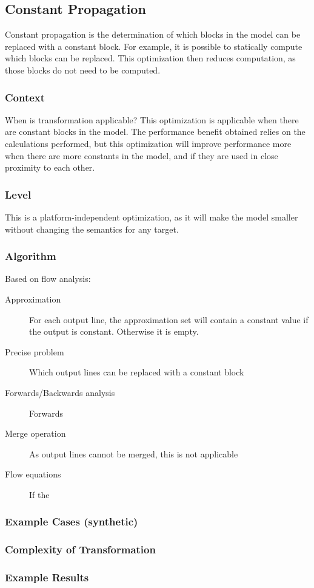 \subsection{Constant Propagation}

Constant propagation is the determination of which blocks in the model can be replaced with a constant block. For example, it is possible to statically compute which blocks can be replaced. This optimization then reduces computation, as those blocks do not need to be computed.

\subsubsection{Context}
When is transformation applicable?
This optimization is applicable when there are constant blocks in the model. The performance benefit obtained relies on the calculations performed, but this optimization will improve performance more when there are more constants in the model, and if they are used in close proximity to each other.


\subsubsection{Level}
This is a platform-independent optimization, as it will make the model smaller without changing the semantics for any target.

\subsubsection{Algorithm}
Based on flow analysis:
\begin{description}
\item[Approximation] For each output line, the approximation set will contain a constant value if the output is constant. Otherwise it is empty.

\item[Precise problem] Which output lines can be replaced with a constant block

\item[Forwards/Backwards analysis] Forwards

\item[Merge operation] As output lines cannot be merged, this is not applicable

\item[Flow equations] If the 
\end{description}
\subsubsection{Example Cases (synthetic)}

\subsubsection{Complexity of Transformation}

\subsubsection{Example Results}